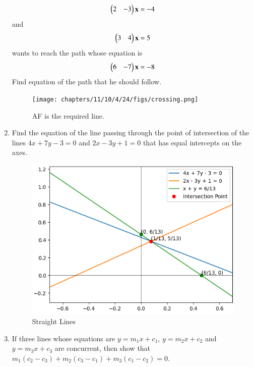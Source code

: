 \begin{enumerate}[label=\thesection.\arabic*,ref=\thesection.\theenumi]
    \begin{align}
        \myvec{2&-3}\vec{x} = -4 
        \label{eq:chapters/11/10/4/24/L1}
    \end{align}
    and
    \begin{align}
        \myvec{3&4}\vec{x} = 5
        \label{eq:chapters/11/10/4/24/L2}
    \end{align} 
    wants to reach the path whose equation is 
    \begin{align}
        \myvec{6&-7}\vec{x} = -8
        \label{eq:chapters/11/10/4/24/L3}
    \end{align}
    Find equation of the path that he should follow.
\\
    \solution 
		
		\begin{figure}[H]
        \centering
        \texttt{[image: chapters/11/10/4/24/figs/crossing.png]}
        \caption{AF is the required line.}
        \label{fig:chapters/11/10/4/24/crossing}
    \end{figure}
	\item Find the equation of the line passing through the point of intersection of the lines $4x + 7y - 3 = 0$ and $2x - 3y + 1 = 0$ that has equal intercepts on the axes.\\
	\solution 
	  
\begin{figure}[H]
    \centering
    \includegraphics[width=\columnwidth]{chapters/11/10/4/12/figs/straightline.png}
    \caption{Straight Lines}
    \label{fig:enter-label}
\end{figure}
   \item If three lines whose equations are $y=m_1x+c_1$, $y=m_2x+c_2$ and $y=m_3x+c_3$ are concurrent, then show that $m_1(c_2 - c_3) + m_2(c_3 - c_1) + m_3(c_1 - c_2) = 0.$\\

\end{enumerate}

